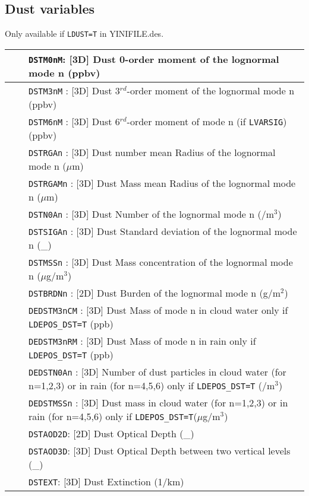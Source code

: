 \subsection{Dust variables}
Only available if \verb|LDUST=T| in YINIFILE.des.
\begin{center}
\begin{tabular}{|>{\centering}p{3cm}|>{\centering}p{2.5cm}|p{11cm}|}
\hline
\multirow{23}{*}{by default}& &{\tt DSTM0nM}: [3D] Dust 0-order moment of the lognormal mode n (ppbv)\\\cline{3-3}
& &{\tt DSTM3nM} : [3D] Dust 3$^{rd}$-order moment of the lognormal mode n (ppbv)\\\cline{3-3}
& &{\tt DSTM6nM} : [3D] Dust 6$^{rd}$-order moment of mode n 
              {\small(if {\tt LVARSIG})} (ppbv)\\\cline{3-3}
& &{\tt DSTRGAn} : [3D] Dust number mean Radius of the lognormal mode n ($\mu$m)
\\\cline{3-3}
& &{\tt DSTRGAMn} : [3D] Dust Mass mean Radius of the lognormal mode n ($\mu$m)\\\cline{3-3}
& &{\tt DSTN0An} : [3D] Dust Number of the lognormal mode n (/m$^3$)\\\cline{3-3}
& &{\tt DSTSIGAn} : [3D] Dust Standard deviation of the lognormal mode n (\_)\\\cline{3-3}
& &{\tt DSTMSSn} : [3D] Dust Mass concentration of the lognormal mode n 
($\mu$g/m$^3$)\\\cline{3-3}
& &{\tt DSTBRDNn} : [2D] Dust Burden of the lognormal mode n (g/m$^2$)\\\cline{3-3}
& &{\tt DEDSTM3nCM}  : [3D] Dust Mass of mode n in cloud water only if \verb|LDEPOS_DST=T| (ppb) \\\cline{3-3}
& &{\tt DEDSTM3nRM}  : [3D]  Dust Mass of mode n in rain only if \verb|LDEPOS_DST=T| (ppb)\\\cline{3-3}
& &{\tt DEDSTN0An} : [3D] Number of dust particles in cloud water (for n=1,2,3) or in rain (for n=4,5,6) only if \verb|LDEPOS_DST=T| (/m$^3$)\\\cline{3-3}
& &{\tt DEDSTMSSn} : [3D] Dust mass in cloud water (for n=1,2,3) or in rain (for n=4,5,6) only if \verb|LDEPOS_DST=T|($\mu$g/m$^3$)\\\cline{1-3}
\multirow{3}{*}{NRAD\_3D}& \multirow{3}{*}{$\ge$ 1}&{\tt DSTAOD2D}: [2D] Dust Optical Depth (\_)\\\cline{3-3}
& &{\tt DSTAOD3D}: [3D] Dust Optical Depth between two vertical levels (\_)
\\\cline{3-3}
& &{\tt DSTEXT}: [3D] Dust Extinction (1/km)\\\hline
\end{tabular}
\end{center}
\newpage
